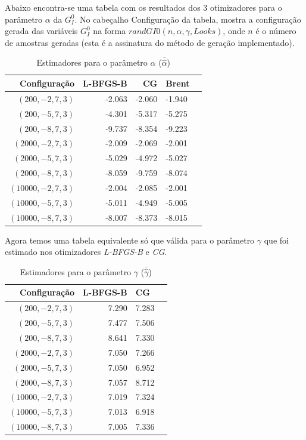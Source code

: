 \documentclass[12pt]{article}
\begin{document}
Abaixo encontra-se uma tabela com os resultados dos 3 otimizadores para o parâmetro $\alpha$ da $G_I^0$. No cabeçalho Configuração da tabela, mostra a configuração gerada das variáveis $G_I^0$ na forma $randGI0(n, \alpha, \gamma, Looks)$, onde $n$ é o número de amostras geradas (esta é a assinatura do método de geração implementado).
\begin{table}[H]
\centering
\caption{Estimadores para o parâmetro $\alpha$ ($ \overline{\widehat{\alpha}}$) }
\vspace{0.2cm}
\begin{tabular}{r|r|r|lr}
\hline
Configuração & L-BFGS-B & CG & Brent \\ 
\hline                               
$(200, -2, 7, 3)$ & -2.063 & -2.060 & -1.940 \\
$(200, -5, 7, 3)$ & -4.301 & -5.317 & -5.275 \\
$(200, -8, 7, 3)$ & -9.737 & -8.354 & -9.223 \\
$(2000, -2, 7, 3)$ & -2.009 & -2.069 & -2.001 \\
$(2000, -5, 7, 3)$ & -5.029 & -4.972 & -5.027 \\
$(2000, -8, 7, 3)$ & -8.059 & -9.759 & -8.074 \\
$(10000, -2, 7, 3)$ & -2.004 & -2.085 & -2.001 \\
$(10000, -5, 7, 3)$ & -5.011 & -4.949 & -5.005 \\
$(10000, -8, 7, 3)$ & -8.007 & -8.373 & -8.015 \\
\end{tabular}
\end{table}

Agora temos uma tabela equivalente só que válida para o parâmetro $\gamma$ que foi estimado nos otimizadores \emph{L-BFGS-B} e \emph{CG}.
\begin{table}[H]
\centering
\caption{Estimadores para o parâmetro $\gamma$ ($ \overline{\widehat{\gamma}}$) }
\vspace{0.2cm}
\begin{tabular}{r|r|lr}
\hline
Configuração & L-BFGS-B & CG \\ 
\hline                               
$(200, -2, 7, 3)$ & 7.290 & 7.283  \\
$(200, -5, 7, 3)$ & 7.477 & 7.506  \\
$(200, -8, 7, 3)$ & 8.641 & 7.330  \\
$(2000, -2, 7, 3)$ & 7.050 & 7.266  \\
$(2000, -5, 7, 3)$ & 7.050 & 6.952  \\
$(2000, -8, 7, 3)$ & 7.057 & 8.712  \\
$(10000, -2, 7, 3)$ & 7.019 & 7.324  \\
$(10000, -5, 7, 3)$ & 7.013 & 6.918  \\
$(10000, -8, 7, 3)$ & 7.005 & 7.336  \\
\end{tabular}
\end{table}
\end{document}
